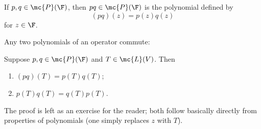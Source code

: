 \documentclass[math0540-lecture-notes.tex]{subfiles}
\begin{document}
\begin{definition}{}
  If $p,q\in \mc{P}(\F)$, then $pq\in \mc{P}(\F)$ is the polynomial defined by \[
    (pq)(z)=p(z)q(z)
  \] for $z\in \F$.
\end{definition}
Any two polynomials of an operator commute:
\begin{proposition}{}
  Suppose $p,q\in \mc{P}(\F)$ and $T\in \mc{L}(V)$. Then
  \begin{enumerate}
    \item $(pq)(T)=p(T)q(T)$;
    \item $p(T)q(T)=q(T)p(T)$.
  \end{enumerate}
\end{proposition}

The proof is left as an exercise for the reader; both follow basically directly from properties of
polynomials (one simply replaces $z$ with $T$).
\end{document}
